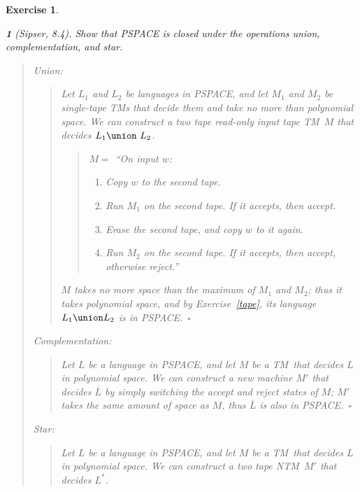 \documentclass{article}
\theoremstyle{break}			%
\newtheorem{exercise}{Exercise}
\theoremstyle{plain}
\newtheorem{subexercise}{}[exercise]
\newenvironment{answer}{\begin{quotation}\noindent}{\end{quotation}}
\newcommand{\sipser}{\textit{Sipser}}
\renewcommand{\qed}{~\ensuremath{\square}}
\newcommand{\TM}{\textsf{TM}}
\newcommand{\NTM}{\textsf{NTM}}
\begin{document}
\begin{exercise}
\begin{subexercise}[\sipser, 8.4]
Show that PSPACE is closed under the operations union,
complementation, and star.
\end{subexercise}
\begin{answer}
Union:
\begin{answer}
Let $L_1$ and $L_2$ be languages in PSPACE, and let $M_1$ and $M_2$ be
single-tape \TM s that decide them and take no more than polynomial
space.  We can construct a two tape read-only input tape \TM\ $M$ that
decides $L_1\union~L_2$.

\begin{answer}
$M =$ ``On input $w$:
\begin{enumerate}
\item Copy $w$ to the second tape.
\item Run $M_1$ on the second tape.  If it accepts, then accept.
\item Erase the second tape, and copy $w$ to it again.
\item Run $M_2$ on the second tape.  If it accepts, then accept,
otherwise reject.''
\end{enumerate}
\end{answer}
$M$ takes no more space than the maximum of $M_1$ and $M_2$; thus it
takes polynomial space, and by Exercise~\ref{tape}, its language
$L_1\union L_2$ is in PSPACE.\qed
\end{answer}

\noindent Complementation:
\begin{answer}
Let $L$ be a language in PSPACE, and let $M$ be a \TM\ that decides $L$
in polynomial space.  We can construct a new machine $M'$ that decides
$\overline L$ by simply switching the accept and reject states of $M$;
$M'$ takes the same amount of space as $M$, thus $\overline L$ is also
in PSPACE.\qed
\end{answer}

\pagebreak
\noindent Star:
\begin{answer}
Let $L$ be a language in PSPACE, and let $M$ be a \TM\ that decides $L$
in polynomial space.  We can construct a two tape \NTM\ $M'$ that
decides $L^*$.


\end{answer}
\end{answer}
\end{exercise}
\end{document}
